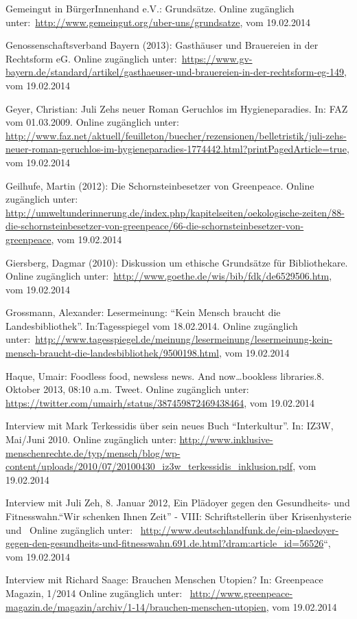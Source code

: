\documentclass[a4paper,
fontsize=11pt,
oneside,
numbers=noperiodatend,
parskip=half-,
bibliography=totoc,
final
]{scrartcl}
\begin{document}
Gemeingut in BürgerInnenhand e.V.: Grundsätze. Online zugänglich
unter:~\url{http://www.gemeingut.org/uber-uns/grundsatze}, vom
19.02.2014

Genossenschaftsverband Bayern (2013): Gasthäuser und Brauereien in der
Rechtsform eG. Online zugänglich
unter:~\url{https://www.gv-bayern.de/standard/artikel/gasthaeuser-und-brauereien-in-der-rechtsform-eg-149},
vom 19.02.2014

Geyer, Christian: Juli Zehs neuer Roman Geruchlos im Hygieneparadies.
In: FAZ vom 01.03.2009. Online zugänglich unter:~
\url{http://www.faz.net/aktuell/feuilleton/buecher/rezensionen/belletristik/juli-zehs-neuer-roman-geruchlos-im-hygieneparadies-1774442.html?printPagedArticle=true},
vom 19.02.2014

Geilhufe, Martin (2012): Die Schornsteinbesetzer von Greenpeace. Online
zugänglich unter:~
\url{http://umweltunderinnerung.de/index.php/kapitelseiten/oekologische-zeiten/88-die-schornsteinbesetzer-von-greenpeace/66-die-schornsteinbesetzer-von-greenpeace},
vom 19.02.2014~

Giersberg, Dagmar (2010): Diskussion um ethische Grundsätze für
Bibliothekare. Online zugänglich
unter:~\url{http://www.goethe.de/wis/bib/fdk/de6529506.htm}, vom
19.02.2014

Grossmann, Alexander: Lesermeinung: \enquote{Kein Mensch braucht die
Landesbibliothek}. In:Tagesspiegel vom 18.02.2014. Online zugänglich
unter:~\url{http://www.tagesspiegel.de/meinung/lesermeinung/lesermeinung-kein-mensch-braucht-die-landesbibliothek/9500198.html},
vom 19.02.2014

Haque, Umair: Foodless food, newsless news. And now\ldots{}bookless
libraries.8. Oktober 2013, 08:10 a.m. Tweet. Online zugänglich unter:~
\url{https://twitter.com/umairh/status/387459872469438464}, vom
19.02.2014

Interview mit Mark Terkessidis über sein neues Buch
\enquote{Interkultur}. In: IZ3W, Mai/Juni 2010. Online zugänglich unter:
\url{http://www.inklusive-menschenrechte.de/typ/mensch/blog/wp-content/uploads/2010/07/20100430_iz3w_terkessidis_inklusion.pdf},
vom 19.02.2014

Interview mit Juli Zeh, 8. Januar 2012, Ein Plädoyer gegen den
Gesundheits- und Fitnesswahn.\enquote{Wir schenken Ihnen Zeit} - VIII:
Schriftstellerin über Krisenhysterie und~ Online zugänglich unter:~
\url{http://www.deutschlandfunk.de/ein-plaedoyer-gegen-den-gesundheits-und-fitnesswahn.691.de.html?dram:article_id=56526}``,
vom 19.02.2014

Interview mit Richard Saage: Brauchen Menschen Utopien? In: Greenpeace
Magazin, 1/2014 Online zugänglich unter:~
\url{http://www.greenpeace-magazin.de/magazin/archiv/1-14/brauchen-menschen-utopien},
vom 19.02.2014
\end{document}

